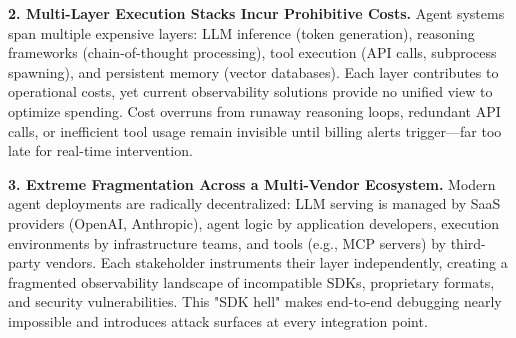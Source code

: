 \documentclass[sigplan,screen，review,9pt]{acmart}
\begin{document}
\textbf{2. Multi-Layer Execution Stacks Incur Prohibitive Costs.} Agent systems span multiple expensive layers: LLM inference (token generation), reasoning frameworks (chain-of-thought processing), tool execution (API calls, subprocess spawning), and persistent memory (vector databases). Each layer contributes to operational costs, yet current observability solutions provide no unified view to optimize spending. Cost overruns from runaway reasoning loops, redundant API calls, or inefficient tool usage remain invisible until billing alerts trigger—far too late for real-time intervention.

\textbf{3. Extreme Fragmentation Across a Multi-Vendor Ecosystem.} Modern agent deployments are radically decentralized: LLM serving is managed by SaaS providers (OpenAI, Anthropic), agent logic by application developers, execution environments by infrastructure teams, and tools (e.g., MCP servers) by third-party vendors. Each stakeholder instruments their layer independently, creating a fragmented observability landscape of incompatible SDKs, proprietary formats, and security vulnerabilities. This "SDK hell" makes end-to-end debugging nearly impossible and introduces attack surfaces at every integration point.
\end{document}
